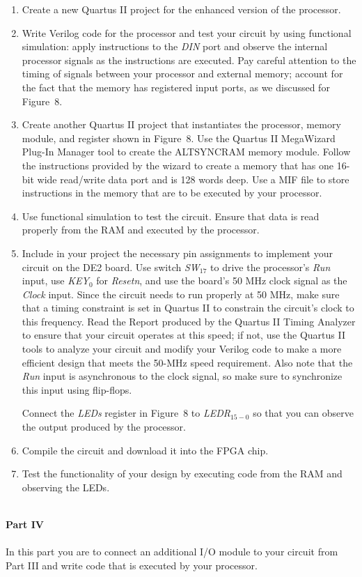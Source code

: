 \documentclass[epsfig,10pt,fullpage]{article}
\begin{document}
\begin{enumerate}
\item Create a new Quartus II project for the enhanced version of the processor.
\item Write Verilog code for the processor and test your circuit by using functional
simulation: apply instructions to the {\it DIN} port and observe the internal processor
signals as the instructions are executed. Pay careful attention to the timing of 
signals between your processor and external memory; account for the fact that the 
memory has registered input ports, as we discussed for Figure~8. 
\item Create another Quartus II project that instantiates the processor, memory module, and
register shown in Figure~8. Use the Quartus II MegaWizard Plug-In Manager tool to 
create the ALTSYNCRAM memory module. Follow the
instructions provided by the wizard to create a memory that has one 16-bit wide read/write
data port and is 128 words deep. Use a MIF file to store instructions in the 
memory that are to be executed by your processor.
\item Use functional simulation to test the circuit. Ensure that data is read properly
from the RAM and executed by the processor.
\item Include in your project the necessary pin assignments to implement your circuit on the DE2
board. Use switch {\it SW}$_{17}$ to drive the processor's {\it Run} input, use 
{\it KEY}$_0$ for {\it Resetn}, and use the board's 50 MHz clock signal 
as the {\it Clock} input. Since the circuit needs to run properly at 50 MHz, make sure that
a timing constraint is set in Quartus II to constrain the circuit's clock to this
frequency. Read the Report produced by the Quartus II Timing Analyzer to ensure that
your circuit operates at this speed; if not, use the Quartus II tools to analyze your
circuit and modify your Verilog code to make a more efficient design that meets the 50-MHz
speed requirement. Also note that the {\it Run} input is asynchronous to the clock signal,
so make sure to synchronize this input using flip-flops.

Connect the {\it LEDs} register in Figure~8 to {\it LEDR}$_{15-0}$ so that you can 
observe the output produced by the processor.
\item Compile the circuit and download it into the FPGA chip.
\item Test the functionality of your design by executing code from the RAM
and observing the LEDs. 
\end{enumerate}
~\\
\noindent
{\bf Part IV}
~\\
~\\
\noindent
In this part you are to connect an additional I/O module to your circuit from Part III
and write code that is executed by your processor.
\end{document}
